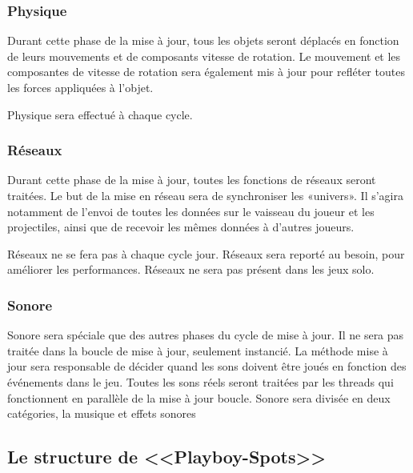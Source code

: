 \subsubsection{Physique} %
\label{ssub:physique}

Durant cette phase de la mise à jour, tous les objets seront déplacés en fonction de leurs mouvements et de composants vitesse de rotation. Le mouvement et les composantes de vitesse de rotation sera également mis à jour pour refléter toutes les forces appliquées à l'objet. 

Physique sera effectué à chaque cycle.


\subsubsection{Réseaux} %
\label{ssub:réseau}

Durant cette phase de la mise à jour, toutes les fonctions de réseaux seront traitées. Le but de la mise en réseau sera de synchroniser les «univers». Il s'agira notamment de l'envoi de toutes les données sur le vaisseau du joueur et les projectiles, ainsi que de recevoir les mêmes données à d'autres joueurs. 

Réseaux ne se fera pas à chaque cycle jour. Réseaux sera reporté au besoin, pour améliorer les performances. Réseaux ne sera pas présent dans les jeux solo.


\subsubsection{Sonore} %
\label{ssub:sonore}

Sonore sera spéciale que des autres phases du cycle de mise à jour. Il ne sera pas traitée dans la boucle de mise à jour, seulement instancié. La méthode mise à jour sera responsable de décider quand les sons doivent être joués en fonction des événements dans le jeu. Toutes les sons réels seront traitées par les threads qui fonctionnent en parallèle de la mise à jour boucle. Sonore sera divisée en deux catégories, la musique et effets sonores



\subsection{Le structure de <<Playboy-Spots>>} %
\label{sub:le_structure_de_playboy_spots_}

